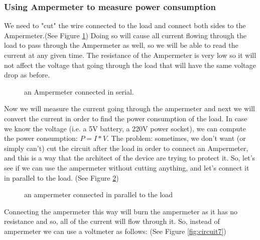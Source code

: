 \subsubsection{Using Ampermeter to measure power consumption}
We need to "cut" the wire connected to the load and connect both sides to the Ampermeter.(See Figure \ref{fig:circuit5})
\newline
Doing so will cause all current flowing through the load to pass through the Ampermeter as well, so we will be able to read the current at any given time. The resistance of the Ampermeter is very low so it will not affect the voltage that going through the load that will have the same voltage drop as before. 
\begin{figure}[h]
    \centering
    
    \caption{an Ampermeter connected in serial.} \label{fig:circuit5}
\end{figure}
\newline
Now we will measure the current going through the ampermeter and next we will convert the current in order to find the power consumption of the load.
\newline
In case we know the voltage (i.e. a 5V battery, a 220V power socket), we can compute the power consumption: $P=I*V$.
\newline
The problem: sometimes, we don't want (or simply can't) cut the circuit after the load in order to connect an Ampermeter, and this is a way that the architect of the device are trying to protect it. So, let’s see if we can use the ampermeter without cutting anything, and let’s connect it in parallel to the load.
(See Figure \ref{fig:circuit6})
\newline
\begin{figure}[h]
    \centering
    
    \caption{an ampermeter connected in parallel to the load} \label{fig:circuit6}
\end{figure}
Connecting the ampermeter this way will burn the ampermeter as it has no resistance and so, all of the current will flow through it. So, instead of ampermeter we can use a voltmeter as follows:
(See Figure \ref{fig:circuit7})
\pagebreak
